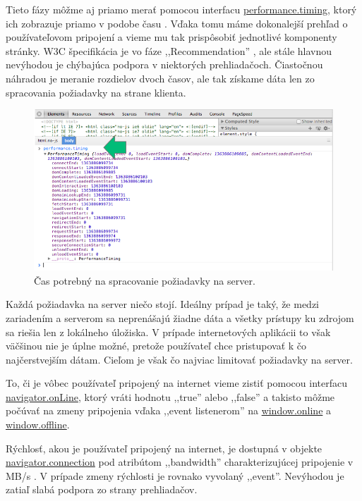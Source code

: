Tieto fázy môžme aj priamo merať pomocou interfacu \url{performance.timing}, ktorý ich zobrazuje priamo v podobe času \cite{1000ms, performancebrowsernetworking}. Vďaka tomu máme dokonalejší prehľad o používateľovom pripojení a vieme mu tak prispôsobiť jednotlivé komponenty stránky. W3C špecifikácia je vo fáze ,,Recommendation'' \cite{timing}, ale stále hlavnou nevýhodou je chýbajúca podpora v niektorých prehliadačoch. Čiastočnou náhradou je meranie rozdielov dvoch časov, ale tak získame dáta len zo spracovania požiadavky na strane klienta.

\begin{figure}[H]
	\centering
	\includegraphics[width=1.0\textwidth]{img/1000ms.png}
	\caption[Čas potrebný na spracovanie požiadavky na server]{
		Čas potrebný na spracovanie požiadavky na server.}
	\label{fig: 1000ms}
\end{figure}

Každá požiadavka na server niečo stojí. Ideálny prípad je taký, že medzi zariadením a serverom sa neprenášajú žiadne dáta a všetky prístupy ku zdrojom sa riešia len z lokálneho úložiska. V prípade internetových aplikácii to však väčšinou nie je úplne možné, pretože používateľ chce pristupovať k čo najčerstvejším dátam. Cieľom je však čo najviac limitovať požiadavky na server.

To, či je vôbec používateľ pripojený na internet vieme zistiť pomocou interfacu \url{navigator.onLine}, ktorý vráti hodnotu ,,true'' alebo ,,false'' a takisto môžme počúvať na zmeny pripojenia vďaka ,,event listenerom'' na \url{window.online} a \url{window.offline}.

Rýchlosť, akou je používateľ pripojený na internet, je dostupná v objekte \url{navigator.connection} pod atribútom ,,bandwidth'' charakterizujúcej pripojenie v MB/s \cite{network}. V prípade zmeny rýchlosti je rovnako vyvolaný ,,event''. Nevýhodou je zatiaľ slabá podpora zo strany prehliadačov.

